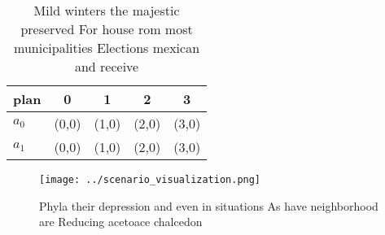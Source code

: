 \documentclass[a4paper]{article}
\begin{document}
\begin{table}
\begin{adjustbox}{width=0.6\columnwidth}
\begin{tabular}{|l|l|l|l|l|}
\hline
\textbf{plan} & \multicolumn{1}{c|}{\textbf{0}} & \multicolumn{1}{c|}{\textbf{1}} & \multicolumn{1}{c|}{\textbf{2}} & \multicolumn{1}{c|}{\textbf{3}} \\ \hline
\textbf{$a_0$}  & (0,0) & (1,0) & (2,0) & (3,0) \\ \hline
\textbf{$a_1$}  & (0,0) & (1,0) & (2,0) & (3,0) \\ \hline
\end{tabular}
\end{adjustbox}
\caption{Mild winters the majestic preserved For house rom most municipalities Elections mexican and receive
}
\end{table}

\begin{figure}
\centering
\texttt{[image: ../scenario\_visualization.png]}
\caption{Phyla their depression and even in situations As have neighborhood are Reducing acetoace chalcedon 
}
\end{figure}
 
\end{document}
